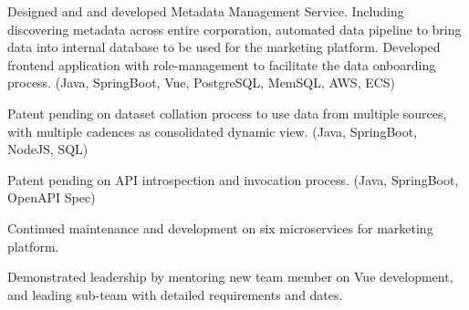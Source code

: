 \documentclass[letterpaper]{deedy-resume-openfont} %
\begin{document}
\sectionsep %



\begin{tightemize}
\item Designed and and developed Metadata Management Service. Including discovering metadata across entire corporation, automated data pipeline to bring data into internal database to be used for the marketing platform. Developed frontend application with role-management to facilitate the data onboarding process. (Java, SpringBoot, Vue, PostgreSQL, MemSQL, AWS, ECS)
\item Patent pending on dataset collation process to use data from multiple sources, with multiple cadences as consolidated dynamic view. (Java, SpringBoot, NodeJS, SQL)
\item Patent pending on API introspection and invocation process. (Java, SpringBoot, OpenAPI Spec)
\item Continued maintenance and development on six microservices for marketing platform.
\item Demonstrated leadership by mentoring new team member on Vue development, and leading sub-team with detailed requirements and dates.
\end{tightemize}

\sectionsep %

\end{document}
